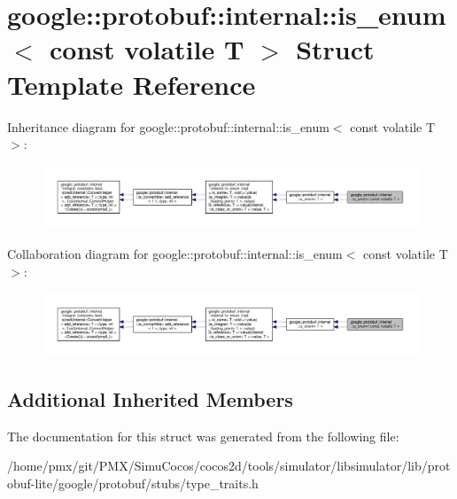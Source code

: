 \hypertarget{structgoogle_1_1protobuf_1_1internal_1_1is__enum_3_01const_01volatile_01T_01_4}{}\section{google\+:\+:protobuf\+:\+:internal\+:\+:is\+\_\+enum$<$ const volatile T $>$ Struct Template Reference}
\label{structgoogle_1_1protobuf_1_1internal_1_1is__enum_3_01const_01volatile_01T_01_4}


Inheritance diagram for google\+:\+:protobuf\+:\+:internal\+:\+:is\+\_\+enum$<$ const volatile T $>$\+:
\nopagebreak
\begin{figure}[H]
\begin{center}
\leavevmode
\includegraphics[width=350pt]{structgoogle_1_1protobuf_1_1internal_1_1is__enum_3_01const_01volatile_01T_01_4__inherit__graph}
\end{center}
\end{figure}


Collaboration diagram for google\+:\+:protobuf\+:\+:internal\+:\+:is\+\_\+enum$<$ const volatile T $>$\+:
\nopagebreak
\begin{figure}[H]
\begin{center}
\leavevmode
\includegraphics[width=350pt]{structgoogle_1_1protobuf_1_1internal_1_1is__enum_3_01const_01volatile_01T_01_4__coll__graph}
\end{center}
\end{figure}
\subsection*{Additional Inherited Members}


The documentation for this struct was generated from the following file\+:\begin{DoxyCompactItemize}
\item 
/home/pmx/git/\+P\+M\+X/\+Simu\+Cocos/cocos2d/tools/simulator/libsimulator/lib/protobuf-\/lite/google/protobuf/stubs/type\+\_\+traits.\+h\end{DoxyCompactItemize}
